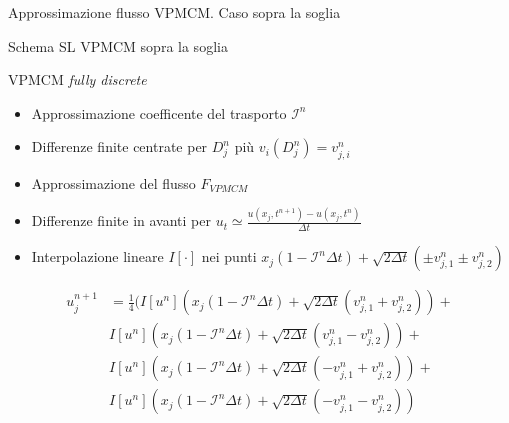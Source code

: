 \begin{frame}{Approssimazione flusso VPMCM. Caso sopra la soglia}
\end{frame}

\begin{frame}{Schema SL VPMCM sopra la soglia}
  \begin{alertblock}{VPMCM \emph{fully discrete}}
    \begin{itemize}
    \item Approssimazione coefficente del trasporto $\mathcal{I}^n$
    \item Differenze finite centrate per $D_j^n$ più
      $v_i(D_j^n)=v_{j,i}^n$
    \item Approssimazione del flusso $F_{VPMCM}$
    \item Differenze finite in avanti per
      $u_t\simeq\frac{u(x_j,t^{n+1})-u(x_j,t^n)}{\Delta t}$
    \item Interpolazione lineare $I[\cdot]$ nei punti
      $x_j(1-\mathcal{I}^n\Delta t)+\sqrt{2\Delta t}(\pm
      v_{j,1}^n\pm v_{j,2}^n)$
    \end{itemize}
    \[
    \begin{aligned}
        u_j^{n+1}&=\frac{1}{4}(I[u^n](x_j(1-\mathcal{I}^n\Delta t)+\sqrt{2\Delta
          t}(v_{j,1}^n+v_{j,2}^n))+ \\
        &I[u^n](x_j(1-\mathcal{I}^n\Delta t)+\sqrt{2\Delta
          t}(v_{j,1}^n-v_{j,2}^n))+\\
        &I[u^n](x_j(1-\mathcal{I}^n\Delta t)+\sqrt{2\Delta
          t}(-v_{j,1}^n+v_{j,2}^n))+\\
        &I[u^n](x_j(1-\mathcal{I}^n\Delta t)+\sqrt{2\Delta
          t}(-v_{j,1}^n-v_{j,2}^n))
    \end{aligned}
    \]
  \end{alertblock}
\end{frame}
 
